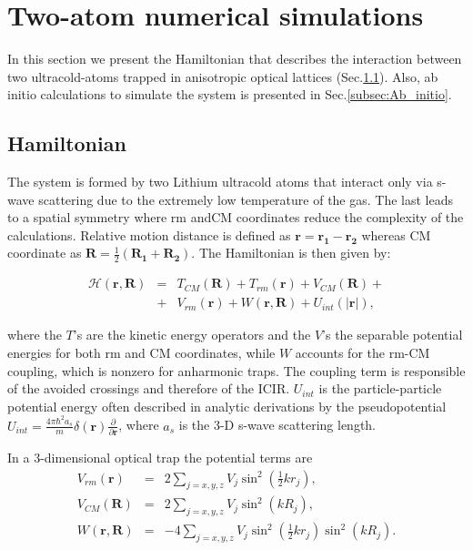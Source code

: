 \documentclass[aps,pre,twocolumn,superscriptaddress,showpacs]{revtex4-1}
\newcommand{\bfeq}[1]{{\boldsymbol{#1}}}
\begin{document}
\section{Two-atom numerical simulations}  \label{sec:system}
In this section we present the Hamiltonian that describes the interaction between two ultracold-atoms trapped in anisotropic optical lattices (Sec.\ref{subsec:H}). Also, ab initio calculations to 
simulate the system is presented in Sec.\ref{subsec:Ab_initio}.

\subsection{Hamiltonian} \label{subsec:H}
The system is formed by two Lithium ultracold atoms that interact only via s-wave scattering due to the extremely low temperature of the gas. The last leads to a spatial symmetry where
rm andCM coordinates reduce the complexity of the calculations. Relative motion distance is defined as $\bfeq{r} = \bfeq{r_1} - \bfeq{r_2}$ whereas CM coordinate as 
$\bfeq{R} = \frac{1}{2}(\bfeq{R_1} + \bfeq{R_2})$. The Hamiltonian is then given by:
		
\begin{eqnarray}
\mathcal{H}(\bfeq{r}, \bfeq{R}) &=& T_{CM}(\bfeq{R}) + T_{rm}(\bfeq{r}) + V_{CM}(\bfeq{R}) +  \nonumber \\ 
&+& V_{rm}(\bfeq{r}) + W(\bfeq{r}, \bfeq{R}) + U_{int}(|\bfeq{r}|), 
 \label{eq:Hamiltonian}
\end{eqnarray}
		
where the $T$'s are the kinetic energy operators and the $V$'s the separable potential energies for both rm and CM coordinates, while $W$ accounts for the rm-CM coupling, which is 
nonzero for anharmonic traps. The coupling term is responsible of 	the avoided crossings and therefore of the ICIR. $U_{int}$ is the particle-particle potential energy often 
described in analytic derivations by the pseudopotential $U_{int} = \frac{4\pi \hbar^2 a_s}{m} \delta(\bfeq{r})\frac{\partial}{\partial \bfeq{r}}$, where $a_s$ is the 3-D s-wave scattering length.
		
In a 3-dimensional optical trap the potential terms are
\begin{eqnarray}
V_{rm}(\bfeq{r}) &=& 2 \sum_{j=x,y,z} V_j \sin^2 \left(\frac{1}{2}k r_j \right), \\
V_{CM}(\bfeq{R}) &=& 2 \sum_{j=x,y,z} V_j \sin^2 \left(k R_j \right), \\
W(\bfeq{r}, \bfeq{R}) &=& -4 \sum_{j=x,y,z} V_j \sin^2 \left(\frac{1}{2}k r_j \right) \sin^2 \left(k R_j \right).
\end{eqnarray}
		
\end{document}
